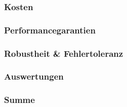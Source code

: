 \subsubsection{Kosten}
\subsubsection{Performancegarantien}
\subsubsection{Robustheit \& Fehlertoleranz}
\subsubsection{Auswertungen}
\subsubsection{Summe}



